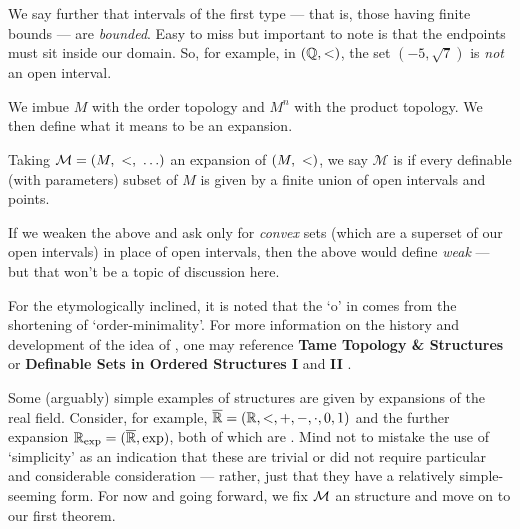 We say further that intervals of the first type — that is, those having finite bounds — are \emph{bounded}. Easy to miss but important to note is that the endpoints must sit inside our domain. So, for example, in $(\mathbb{Q}, <)$, the set $(-5, \sqrt{7})$ is \emph{not} an open interval.

We imbue $M$ with the order topology and $M^n$ with the product topology. We then define what it means to be an \om expansion.

\begin{definition}[\Om expansion]
  Taking $\mathcal{M} = (M, \ <, \ \hdots)$ an expansion of $(M, \ <)$, we say $\mathcal{M}$ is \om if every definable (with parameters) subset of $M$ is given by a finite union of open intervals and points.
\end{definition}

\begin{svgraybox}
  If we weaken the above and ask only for \emph{convex} sets (which are a superset of our open intervals) in place of open intervals, then the above would define \emph{weak \omy} — but that won't be a topic of discussion here.
\end{svgraybox}

For the etymologically inclined, it is noted that the `o' in \om comes from the shortening of `order-minimality'. For more information on the history and development of the idea of \omy, one may reference
\textbf{Tame Topology \& \Om Structures} \cite{dries_tame_1998} or \textbf{Definable Sets in Ordered Structures I} \cite{pillay_definable_1986} and \textbf{II} \cite{knight_definable_1986}.


Some (arguably) simple examples of \om structures are given by expansions of the real field. Consider, for example, $\overline{\mathbb{R}} = (\mathbb{R}, <, +, -, \cdot, 0, 1)$ and the further expansion $\mathbb{R}_{\textrm{exp}} = (\overline{\mathbb{R}}, \exp)$, both of which are \om. Mind not to mistake the use of `simplicity' as an indication that these are trivial or did not require particular and considerable consideration — rather, just that they have a relatively simple-seeming form. For now and going forward, we fix $\mathcal{M}$ an \om structure and move on to our first theorem.

